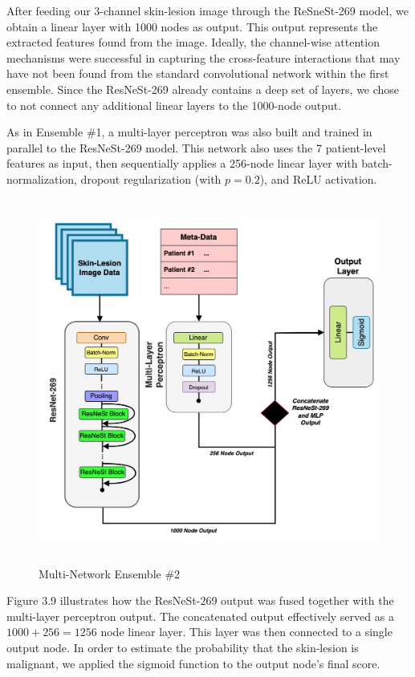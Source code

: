 \documentclass [MAS] {uclathes}
\begin{document}
After feeding our 3-channel skin-lesion image through the ReSneSt-269 model, we obtain a linear layer with 1000 nodes as output. This output represents the extracted features found from the image. Ideally, the channel-wise attention mechanisms were successful in capturing the cross-feature interactions that may have not been found from the standard convolutional network within the first ensemble. Since the ResNeSt-269 already contains a deep set of layers, we chose to not connect any additional linear layers to the 1000-node output.

As in Ensemble \#1,  a multi-layer perceptron was also built and trained in parallel to the ResNeSt-269 model. This network also uses the 7 patient-level features as input, then sequentially applies a 256-node linear layer with batch-normalization, dropout regularization (with $p=0.2$), and ReLU activation.


\begin{figure}[h]
\centering
\includegraphics[height = 120mm, width= 140mm]{imgs/ens2_arch.png}
\caption{Multi-Network Ensemble \#2}
\label{fig:ens2_arch}
\end{figure}

Figure 3.9 illustrates how the ResNeSt-269 output was fused together with the multi-layer perceptron output. The concatenated output effectively served as a $1000+256 = 1256$ node linear layer. This layer was then connected to a single output node. In order to estimate the probability that the skin-lesion is malignant, we applied the sigmoid function to the output node's final score.
\end{document}
